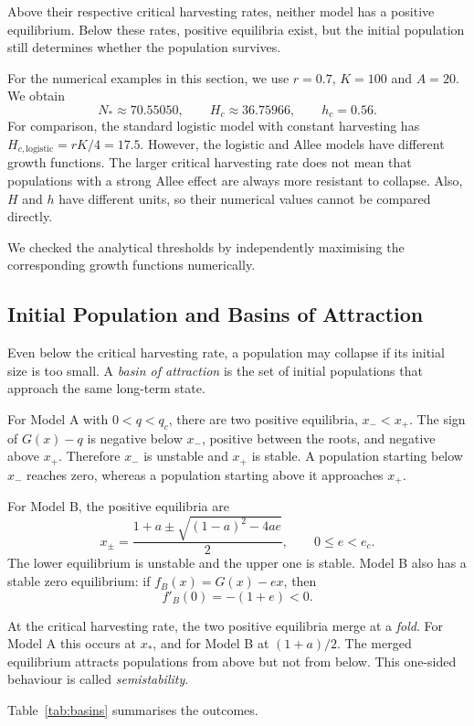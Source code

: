 Above their respective critical harvesting rates, neither model
has a positive equilibrium. Below these rates, positive
equilibria exist, but the initial population still determines
whether the population survives.

For the numerical examples in this section, we use
$r=0.7$, $K=100$ and $A=20$. We obtain
\[
N_*\approx70.55050,\qquad
H_c\approx36.75966,\qquad h_c=0.56.
\]
For comparison, the standard logistic model with constant
harvesting has $H_{c,\mathrm{logistic}}=rK/4=17.5$.
However, the logistic and Allee models have different growth
functions. The larger critical harvesting rate does not mean
that populations with a strong Allee effect are always more
resistant to collapse. Also, $H$ and $h$ have different
units, so their numerical values cannot be compared directly.

We checked the analytical thresholds by independently
maximising the corresponding growth functions numerically.

\subsection{Initial Population and Basins of Attraction}
\label{sec:wp03-basins}

Even below the critical harvesting rate, a population may
collapse if its initial size is too small. A \emph{basin of
attraction} is the set of initial populations that approach
the same long-term state.

For Model A with $0<q<q_c$, there are two positive
equilibria, $x_-<x_+$. The sign of $G(x)-q$ is negative
below $x_-$, positive between the roots, and negative
above $x_+$. Therefore $x_-$ is unstable and $x_+$
is stable. A population starting below $x_-$ reaches
zero, whereas a population starting above it approaches
$x_+$.

For Model B, the positive equilibria are
\[
x_\pm=
\frac{1+a\pm\sqrt{(1-a)^2-4ae}}{2},
\qquad 0\leq e<e_c.
\]
The lower equilibrium is unstable and the upper one is
stable. Model B also has a stable zero equilibrium:
if $f_B(x)=G(x)-ex$, then
\[
f'_B(0)=-(1+e)<0.
\]

At the critical harvesting rate, the two positive
equilibria merge at a \emph{fold}. For Model A this
occurs at $x_*$, and for Model B at $(1+a)/2$.
The merged equilibrium attracts populations from
above but not from below. This one-sided behaviour
is called \emph{semistability}.

Table~\ref{tab:basins} summarises the outcomes.

